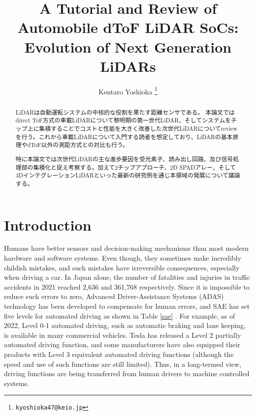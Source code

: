 \documentclass[letterpaper, 10 pt, conference]{ieeeconf}  %
\title{\LARGE \bf
A Tutorial and Review of Automobile dToF LiDAR SoCs: Evolution of Next Generation LiDARs
}
\author{Kentaro Yoshioka%
\thanks{
        {\tt\small kyoshioka47@keio.jp}}
}
\begin{document}
\maketitle
\thispagestyle{empty}
\pagestyle{empty}

\begin{abstract}
LiDARは自動運転システムの中核的な役割を果たす距離センサである。
本論文ではdirect ToF方式の車載LiDARについて黎明期の第一世代LiDAR、そしてシステムをチップ上に集積することでコストと性能を大きく改善した次世代LiDARについてreviewを行う。これから車載LiDARについて入門する読者を想定しており、LiDARの基本原理やdToF以外の測距方式との対比も行う。

特に本論文では次世代LiDARの主な進歩要因を受光素子、読み出し回路、及び信号処理部の集積化と捉え考察する。加えて2チップアプローチ、2D SPADアレー、そして3DインテグレーションLiDARといった最新の研究例を通じ本領域の発展について議論する。

\end{abstract}

\section{Introduction}
Humans have better sensors and decision-making mechanisms than most modern hardware and software systems. Even though, they sometimes make incredibly childish mistakes, and such mistakes have irreversible consequences, especially when driving a car. In Japan alone, the number of fatalities and injuries in traffic accidents in 2021 reached 2,636 and 361,768 respectively\cite{keisatsu}. Since it is impossible to reduce such errors to zero, Advanced Driver-Assistance Systems (ADAS) technology has been developed to compensate for human errors, and SAE has set five levels for automated driving as shown in Table \ref{sae} \cite{sae}. For example, as of 2022, Level 0-1 automated driving, such as automatic braking and lane keeping, is available in many commercial vehicles. Tesla has released a Level 2 partially automated driving function, and some manufacturers have also equipped their products with Level 3 equivalent automated driving functions (although the speed and use of such functions are still limited)\cite{honda}. Thus, in a long-termed view, driving functions are being transferred from human drivers to machine controlled systems.
\end{document}
